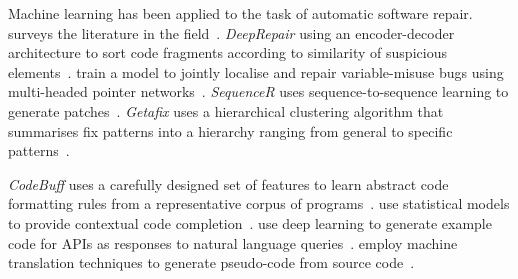 Machine learning has been applied to the task of automatic software repair. \citeauthor{Monperrus2018} surveys the literature in the field~\cite{Monperrus2018}.
\emph{DeepRepair} using an encoder-decoder architecture to sort code fragments according to similarity of suspicious elements~\cite{White2019}.
\citeauthor{Vasic2019} train a model to jointly localise and repair variable-misuse bugs using multi-headed pointer networks~\cite{Vasic2019}.
\emph{SequenceR} uses sequence-to-sequence learning to generate patches~\cite{Chen2018}.
\emph{Getafix} uses a hierarchical clustering algorithm that summarises fix patterns into a hierarchy ranging from general to specific patterns~\cite{Bader2019}.

\emph{CodeBuff} uses a carefully designed set of features to learn abstract code formatting rules from a representative corpus of programs~\cite{Terence2016}.
\citeauthor{Raychev2014} use statistical models to provide contextual code completion~\cite{Raychev2014}.
\citeauthor{Zhang2015a} use deep learning to generate example code for APIs as responses to natural language queries~\cite{Zhang2015a}.
\citeauthor{Oda2015} employ machine translation techniques to generate pseudo-code from source code~\cite{Oda2015}.
